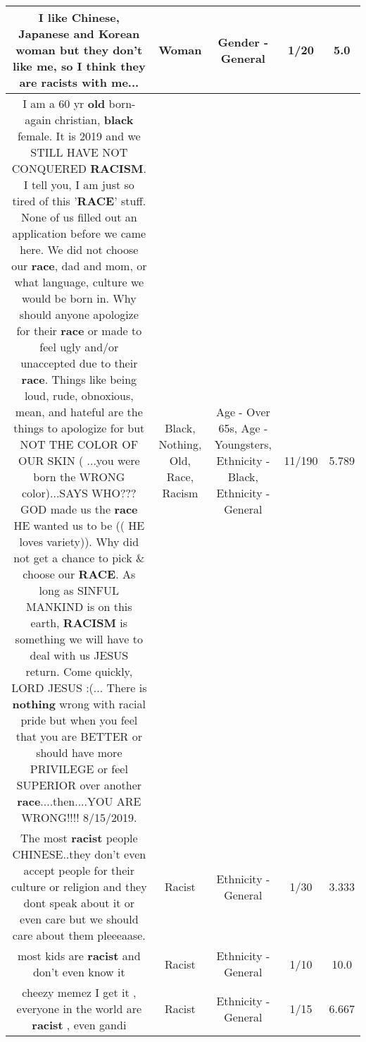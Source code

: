\documentclass[11pt]{article}
\newlength\mylength
\begin{document}
\begin{center}
\begin{longtable}{|C{.65\mylength}|C{.30\mylength}|C{.12\mylength}|C{.12\mylength}|C{.12\mylength}|}
  \small I like Chinese, Japanese and Korean \textbf{woman} but they don't like me, so I think they are racists with me...\normalsize   & Woman & Gender - General & 1/20 & 5.0 \\  \hline
  \small I am a 60 yr \textbf{old} born-again christian, \textbf{black} female.  It is 2019 and we STILL HAVE NOT CONQUERED \textbf{RACISM}. I tell you, I am just so tired of this '\textbf{RACE}' stuff.  None of us filled out an application before we came here.  We did not choose our \textbf{race}, dad and mom, or what language, culture we would be born in.  Why should anyone apologize for their \textbf{race} or made to feel ugly and/or unaccepted due to their \textbf{race}.  Things like being loud, rude, obnoxious, mean, and hateful are the things to apologize for but NOT THE COLOR OF OUR SKIN  ( ...you were born the WRONG color)...SAYS WHO??? GOD made us the \textbf{race} HE wanted us to be (( HE loves variety)).  Why did not get a chance to pick \& choose our \textbf{RACE}.  As long as SINFUL MANKIND is on this earth, \textbf{RACISM}  is something we will have to deal with us JESUS return.  Come quickly, LORD JESUS :(...   There is \textbf{nothing} wrong with racial pride but when you feel that you are BETTER or should have more PRIVILEGE or feel SUPERIOR over another \textbf{race}....then....YOU ARE WRONG!!!!   8/15/2019.\normalsize   & Black, Nothing, Old, Race, Racism & Age - Over 65s, Age - Youngsters, Ethnicity - Black, Ethnicity - General & 11/190 & 5.789 \\  \hline
  \small The most \textbf{racist} people CHINESE..they don't even accept people for their culture or religion and they dont speak about it or even care but we should care about them pleeeaase.\normalsize   & Racist & Ethnicity - General & 1/30 & 3.333 \\  \hline
  \small {} most kids are \textbf{racist} and don't even know it\normalsize   & Racist & Ethnicity - General & 1/10 & 10.0 \\  \hline
  \small cheezy memez I get it , everyone in the world are \textbf{racist} , even gandi\normalsize   & Racist & Ethnicity - General & 1/15 & 6.667 \\  \hline

\end{longtable}
\end{center}
\end{document}
